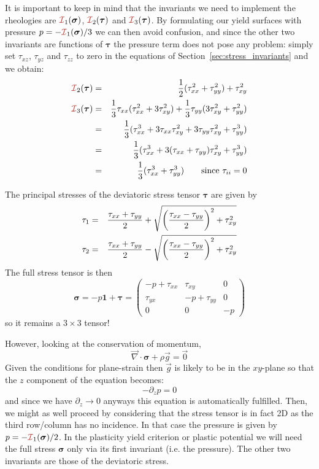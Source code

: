 It is important to keep in mind that the invariants we need to implement 
the rheologies are ${\III}_1({\bm \sigma})$,  ${\III}_2({\bm \tau})$ and ${\III}_3({\bm \tau})$.
By formulating our yield surfaces with pressure $p=-{\III}_1({\bm \sigma})/3$ we can then 
avoid confusion, and since the other two invariants are functions of ${\bm \tau}$ the pressure 
term does not pose any problem: simply set $\tau_{xz}$, $\tau_{yz}$ and $\tau_{zz}$ to zero in the 
equations of Section~\ref{sec:stress_invariants} and we obtain:
\begin{eqnarray}
{\III}_2({\bm \tau}) &=&\frac{1}{2}(\tau_{xx}^2 + \tau_{yy}^2 ) + \tau_{xy}^2 \\ 
{\III}_3({\bm \tau}) 
&=& \frac{1}{3} \tau_{xx} (  \tau_{xx}^2 + 3 \tau_{xy}^2 ) 
+ \frac{1}{3} \tau_{yy} (3 \tau_{xy}^2 +   \tau_{yy}^2 )   \nn\\
&=& \frac{1}{3}(  \tau_{xx}^3 + 3 \tau_{xx}\tau_{xy}^2  
+ 3 \tau_{yy} \tau_{xy}^2 +   \tau_{yy}^3 )   \nn\\
&=& \frac{1}{3}(  \tau_{xx}^3 + 3 (\tau_{xx}+\tau_{yy}) \tau_{xy}^2  +  \tau_{yy}^3 )   \nn\\
&=& \frac{1}{3}(  \tau_{xx}^3 +  \tau_{yy}^3 )  \qquad \text{since } \tau_{ii}=0 
\end{eqnarray}



The principal stresses of the deviatoric stress tensor $\bm\tau$ are given by
\begin{eqnarray}
\tau_1 &=& \frac{ \tau_{xx}+\tau_{yy}}{2} 
+ \sqrt{ \left(\frac{\tau_{xx}-\tau_{yy}}{2}\right)^2 +\tau_{xy}^2 } \nonumber\\
\tau_2 &=& \frac{ \tau_{xx}+\tau_{yy}}{2} 
- \sqrt{ \left(\frac{\tau_{xx}-\tau_{yy}}{2}\right)^2 +\tau_{xy}^2 } 
\end{eqnarray}
The full stress tensor is then
\[
\bm\sigma = -p \bm 1 + \bm\tau
= \left(\begin{array}{ccc}
-p+\tau_{xx} & \tau_{xy} & 0 \\
\tau_{yx} & -p+\tau_{yy} & 0 \\
0 & 0 & -p
\end{array}\right)
\]
so it remains a $3\times 3$ tensor!

However, looking at the conservation of momentum, 
\[
\vec\nabla \cdot \bm\sigma + \rho \vec g = \vec 0
\]
Given the conditions for plane-strain then $\vec g$ is likely to be in 
the $xy$-plane so that the $z$ component of the equation becomes:
\[
-\partial_z p = 0
\]
and since we have $\partial_z \rightarrow 0$ anyways this equation 
is automatically fulfilled. Then, we might as well proceed 
by considering that the stress tensor is in fact 2D as the third row/column
has no incidence. In that case the pressure is given by $p=-{\III}_1(\bm\sigma)/2$.
In the plasticity yield criterion or plastic potential we will 
need the full stress ${\bm \sigma}$ only via its first invariant (i.e. the pressure). 
The other two invariants are those of the deviatoric stress. 

